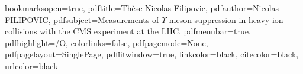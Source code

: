 \graphicspath{{.}{images/}}

\usepackage{subcaption}



\usepackage{color}


\hypersetup
{
bookmarksopen=true,
pdftitle={Thèse Nicolas Filipovic},
pdfauthor={Nicolas FILIPOVIC}, %
pdfsubject={Measurements of $\Upsilon$ meson suppression in heavy ion collisions with the CMS experiment at the LHC}, %
pdfmenubar=true, %
pdfhighlight=/O, %
colorlinks=false, %
pdfpagemode=None, %
pdfpagelayout=SinglePage, %
pdffitwindow=true, %
linkcolor=black, %
citecolor=black, %
urlcolor=black %
}


\setcounter{secnumdepth}{3}
\setcounter{tocdepth}{2}


\newcommand{\pd}[2]{\frac{\partial #1}{\partial #2}}
\def\abs{\operatorname{abs}}
\def\argmax{\operatornamewithlimits{arg\,max}}
\def\argmin{\operatornamewithlimits{arg\,min}}
\def\diag{\operatorname{Diag}}
\newcommand{\eqRef}[1]{(\ref{#1})}

\usepackage{rotating}                    %
\usepackage{fancyhdr}                    %


